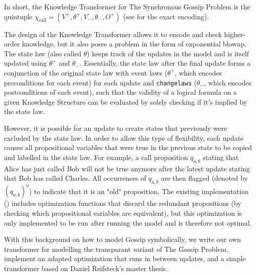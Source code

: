 In short, the Knowledge Transformer for The Synchronous Gossip Problem is the quintuple $\chi_\text{call}=(V^+,\theta ^+,V_-,\theta _-,O^+)$ (see \cite{GattingerThesis2018} for the exact encoding).

The design of the Knowledge Transformer allows it to encode and check higher-order knowledge, but it also poses a problem in the form of exponential blowup. The state law (also called $\theta$) keeps track of the updates in the model and is itself updated using $\theta^+$ and $\theta_-$. Essentially, the state law  after the final update forms a conjunction of the original state law with event laws ($\theta^+$, which encodes preconditions for each event) for each update and \texttt{changelaws} ($\theta_-$, which encodes postconditions of each event), such that the validity of a logical formula on a given Knowledge Structure can be evaluated by solely checking if it's implied by the state law. 

However, it is possible for an update to create states that previously were excluded by the state law. In order to allow this type of flexibility, each update causes all propositional variables that were true in the previous state to be copied and labelled in the state law. For example, a call proposition $q_{a,b}$ stating that Alice has just called Bob will not be true anymore after the latest update stating that Bob has called Charles. All occurrences of $q_{a,b}$ are then flagged (denoted by $(q_{a,b})^o$) to indicate that it is an "old" proposition. The existing implementation (\cite{GattingerThesis2018}) includes optimization functions that discard the redundant propositions (by checking which propositional variables are equivalent), but this optimization is only implemented to be run after running the model and is therefore not optimal. 

With this background on how to model Gossip symbolically, we write our own transformer for modelling the transparant variant of The Gossip Problem, implement an adapted optimization that runs in between updates, and a simple transformer based on Daniel Reifsteck's master thesis. 


